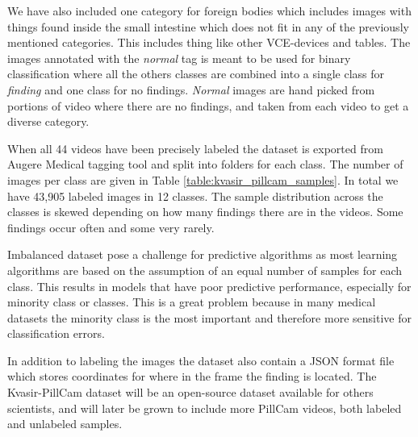 \documentclass[thesis.tex]{subfiles}
\begin{document}
We have also included one category for foreign bodies which includes images with things found inside the small intestine which does not fit in any of the previously mentioned categories. This includes thing like other VCE-devices and tables. The images annotated with the \textit{normal} tag is meant to be used for binary classification where all the others classes are combined into a single class for \textit{finding} and one class for no findings. \textit{Normal} images are hand picked from portions of video where there are no findings, and taken from each video to get a diverse category.

When all 44 videos have been precisely labeled the dataset is exported from Augere Medical tagging tool and split into folders for each class. The number of images per class are given in Table \ref{table:kvasir_pillcam_samples}. In total we have 43,905 labeled images in 12 classes. The sample distribution across the classes is skewed depending on how many findings there are in the videos. Some findings occur often and some very rarely. 

Imbalanced dataset pose a challenge for predictive algorithms as most learning algorithms are based on the assumption of an equal number of samples for each class. This results in models that have poor predictive performance, especially for minority class or classes. This is a great problem because in many medical datasets the minority class is the most important and therefore more sensitive for classification errors.

In addition to labeling the images the dataset also contain a JSON format file which stores coordinates for where in the frame the finding is located. The Kvasir-PillCam dataset will be an open-source dataset available for others scientists, and will later be grown to include more PillCam videos, both labeled and unlabeled samples.
\end{document}
